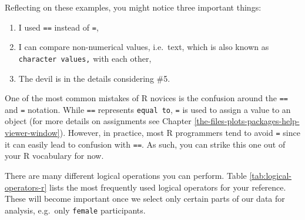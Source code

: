 \documentclass[
]{book}
\providecommand{\tightlist}{%
  \setlength{\itemsep}{0pt}\setlength{\parskip}{0pt}}
\begin{document}
Reflecting on these examples, you might notice three important things:

\begin{enumerate}
\def\labelenumi{\arabic{enumi}.}
\tightlist
\item
  I used \texttt{==} instead of \texttt{=},
\item
  I can compare non-numerical values, i.e.~text, which is also known as \texttt{character\ values,} with each other,
\item
  The devil is in the details considering \#5.
\end{enumerate}

One of the most common mistakes of R novices is the confusion around the \texttt{==} and \texttt{=} notation. While \texttt{==} represents \texttt{equal\ to}, \texttt{=} is used to assign a value to an object (for more details on assignments see Chapter \ref{the-files-plots-packages-help-viewer-window}). However, in practice, most R programmers tend to avoid \texttt{=} since it can easily lead to confusion with \texttt{==}. As such, you can strike this one out of your R vocabulary for now.

There are many different logical operations you can perform. Table \ref{tab:logical-operators-r} lists the most frequently used logical operators for your reference. These will become important once we select only certain parts of our data for analysis, e.g.~only \texttt{female} participants.
\end{document}
